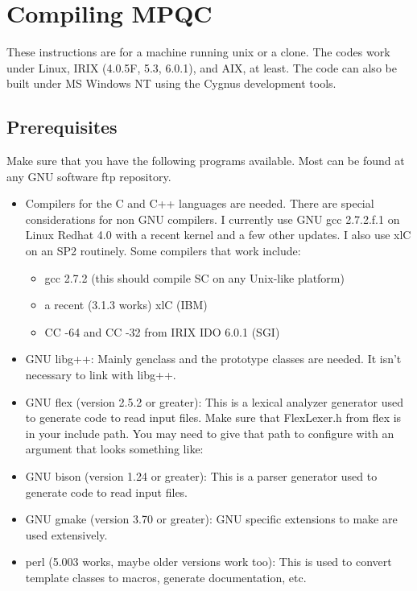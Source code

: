 
\chapter{Compiling MPQC}


These instructions are for a machine running unix or a clone. The codes
work under Linux, IRIX (4.0.5F, 5.3, 6.0.1), and AIX, at least.  The code
can also be built under MS Windows NT using the Cygnus development tools.

\section{Prerequisites}
 Make sure that you have the following programs available. Most can be
found at any GNU software ftp repository.
  \begin{itemize}
    \item Compilers for the C and C++ languages are needed.
          There are special considerations for non
          GNU compilers. I currently use GNU gcc 2.7.2.f.1 on Linux Redhat 4.0
          with a recent kernel and a few other updates. I also use
          xlC on an SP2 routinely. Some compilers that work include:
      \begin{itemize}
        \item  gcc 2.7.2 (this should compile SC on any Unix-like platform)
        \item  a recent (3.1.3 works) xlC (IBM)
        \item  CC -64 and CC -32 from IRIX IDO 6.0.1 (SGI)
      \end{itemize}
    \item GNU libg++: Mainly genclass and the prototype classes are needed.
          It isn't necessary to link with libg++.
    \item GNU flex (version 2.5.2 or greater): This is a lexical analyzer
          generator used to generate code to read input files. Make sure that
          FlexLexer.h from flex is in your include path. You may need to
          give that path to configure with an argument that looks something
          like: 
    \item GNU bison (version 1.24 or greater): This is a parser generator used
          to generate code to read input files.
    \item GNU gmake (version 3.70 or greater): GNU specific extensions to make
          are used extensively.
    \item perl (5.003 works, maybe older versions work too): This is used to
          convert template classes to macros, generate documentation, etc.
  \end{itemize}

